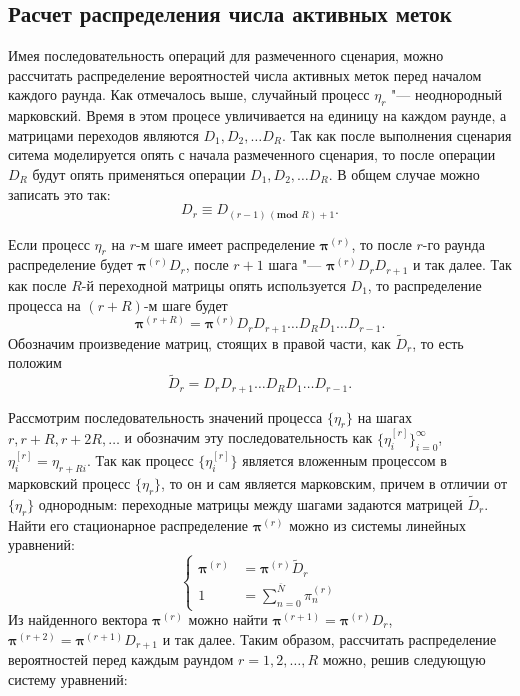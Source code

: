 \subsection{Расчет распределения числа активных меток}
Имея последовательность операций для размеченного сценария, можно рассчитать распределение вероятностей числа активных меток перед началом каждого раунда. Как отмечалось выше, случайный процесс $\eta_r$ "--- неоднородный марковский. Время в этом процесе увличивается на единицу на каждом раунде, а матрицами переходов являются $D_1, D_2, \dots D_R$. Так как после выполнения сценария ситема моделируется опять с начала  размеченного сценария, то после операции $D_R$ будут опять применяться операции $D_1, D_2, \dots D_R$. В общем случае можно записать это так:
$$
	D_r \equiv D_{(r - 1)\, (\textbf{mod } R) + 1}.
$$

Если процесс $\eta_r$ на $r$-м шаге имеет распределение $\bm{\pi}^{(r)}$, то после $r$-го раунда распределение будет $\bm{\pi}^{(r)} D_r$, после $r+1$ шага "--- $\bm{\pi}^{(r)} D_r D_{r+1}$ и так далее. Так как после $R$-й переходной матрицы опять используется $D_1$, то распределение процесса на $(r+R)$-м шаге будет
$$
	\bm{\pi}^{(r+R)} = \bm{\pi}^{(r)} D_r D_{r+1} \dots D_R D_1 \dots D_{r-1}.
$$
Обозначим произведение матриц, стоящих в правой части, как $\widetilde{D}_{r}$, то есть положим
$$
	\widetilde{D}_r = D_r D_{r+1} \dots D_R D_1 \dots D_{r-1}.
$$

Рассмотрим последовательность значений процесса $\{ \eta_r \}$ на шагах $r, r+R, r+2R, \dots$ и обозначим эту последовательность как $\{ \eta_i^{[r]} \}_{i=0}^\infty$, $\eta_i^{[r]} = \eta_{r+Ri}$. Так как процесс $\{ \eta_{i}^{[r]} \}$ является вложенным процессом в марковский процесс $\{ \eta_r \}$, то он и сам является марковским, причем в отличии от $\{ \eta_r \}$ однородным: переходные матрицы между шагами задаются матрицей $\widetilde{D}_r$. Найти его стационарное распределение $\bm{\pi}^{(r)}$ можно из системы линейных уравнений:
$$
	\begin{cases}
		\bm{\pi}^{(r)} &= \bm{\pi}^{(r)} \widetilde{D}_r\\
		1 &= \sum\limits_{n=0}^{\overline{N}} \pi^{(r)}_n
	\end{cases}
$$
Из найденного вектора $\bm{\pi}^{(r)}$ можно найти $\bm{\pi}^{(r+1)} = \bm{\pi}^{(r)} D_r$, $\bm{\pi}^{(r+2)} = \bm{\pi}^{(r+1)} D_{r+1}$ и так далее. Таким образом, рассчитать распределение вероятностей перед каждым раундом $r = 1, 2, \dots, R$ можно, решив следующую систему уравнений:

